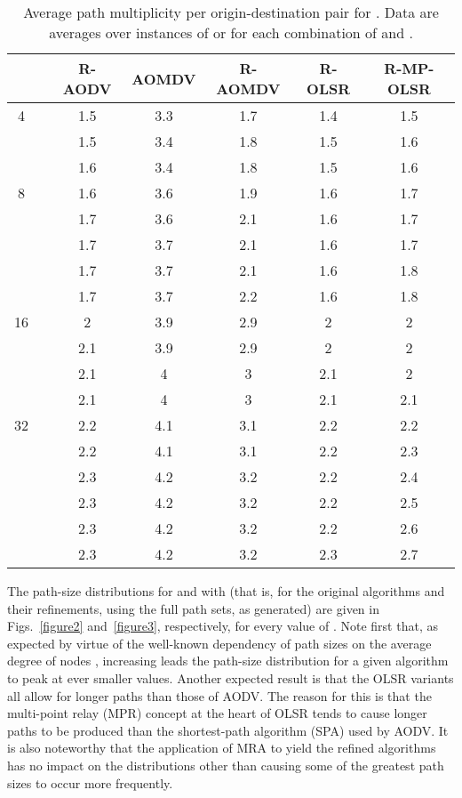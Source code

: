 \documentclass{article}
\begin{document}
\begin{table}[t]
\centering
\caption{Average path multiplicity per origin-destination pair for . Data
are averages over  instances of  or 
for each combination of  and .}
\small
\begin{tabular}{ccccccc}
\hline
 &  & R-AODV & AOMDV & R-AOMDV & R-OLSR & R-MP-OLSR \\ \hline
4        &    & 1.5    & 3.3   & 1.7     & 1.4    & 1.5 \\
         &   & 1.5    & 3.4   & 1.8     & 1.5    & 1.6 \\
         &  & 1.6    & 3.4   & 1.8     & 1.5    & 1.6 \\ \hline
8        &    & 1.6    & 3.6   & 1.9     & 1.6    & 1.7 \\
         &   & 1.7    & 3.6   & 2.1     & 1.6    & 1.7 \\
         &   & 1.7    & 3.7   & 2.1     & 1.6    & 1.7 \\
         &   & 1.7    & 3.7   & 2.1     & 1.6    & 1.8 \\
         &  & 1.7    & 3.7   & 2.2     & 1.6    & 1.8 \\ \hline
16       &    & 2      & 3.9   & 2.9     & 2      & 2   \\
         &   & 2.1    & 3.9   & 2.9     & 2      & 2   \\
         &   & 2.1    & 4     & 3       & 2.1    & 2   \\
         &  & 2.1    & 4     & 3       & 2.1    & 2.1 \\ \hline
32       &    & 2.2    & 4.1   & 3.1     & 2.2    & 2.2 \\
         &   & 2.2    & 4.1   & 3.1     & 2.2    & 2.3 \\
         &   & 2.3    & 4.2   & 3.2     & 2.2    & 2.4 \\
         &   & 2.3    & 4.2   & 3.2     & 2.2    & 2.5 \\
         &   & 2.3    & 4.2   & 3.2     & 2.2    & 2.6 \\
         &  & 2.3    & 4.2   & 3.2     & 2.3    & 2.7 \\ \hline
\end{tabular}
 \label{table3}
\end{table}

The path-size distributions for  and  with
 (that is, for the original algorithms and their refinements,
using the full path sets, as generated) are given in Figs.~\ref{figure2}
and~\ref{figure3}, respectively, for every value of . Note first that,
as expected by virtue of the well-known dependency of path sizes on the average
degree of nodes \cite{Dirac1952}, increasing  leads the path-size
distribution for a given algorithm to peak at ever smaller values. Another
expected result is that the OLSR variants all allow for longer paths than those
of AODV. The reason for this is that the multi-point relay (MPR) concept at the
heart of OLSR tends to cause longer paths to be produced than the shortest-path
algorithm (SPA) used by AODV. It is also noteworthy that the application of MRA
to yield the refined algorithms has no impact on the distributions other than
causing some of the greatest path sizes to occur more frequently.
\end{document}

